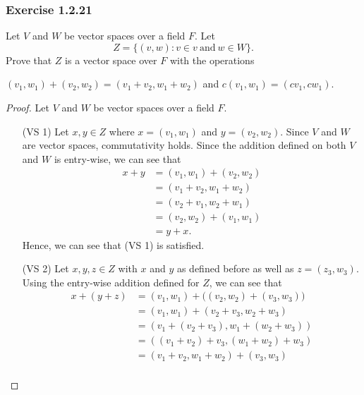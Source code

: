 \subsubsection{Exercise 1.2.21} 
Let \( V  \) and \( W  \) be vector spaces over a field \( F  \). Let 
\[  Z = \{ (v,w): v \in v \ \text{and} \  w \in W  \}. \]
Prove that \( Z  \) is a vector space over \( F  \) with the operations   
\begin{center}
   \( (v_{1}, w_{1}) + (v_{2}, w_{2}) = (v_{1} + v_{2} , w_{1} + w_{2} ) \) and \( c(v_{1}, w_{1} ) = (cv_{1}, cw_{1} ) \). 
\end{center}
\begin{proof}
    Let \( V  \) and \( W  \) be vector spaces over a field \( F  \).
\begin{enumerate}
    \item[(VS 1)] Let \( x,y \in Z  \) where \( x = (v_{1}, w_{1}) \) and \( y = (v_{2}, w_{2}) \). Since \( V  \) and \( W  \) are vector spaces, commutativity holds. Since the addition defined on both \( V  \) and \( W  \) is entry-wise, we can see that 
        \begin{align*}
            x + y &= (v_{1}, w_{1}) + (v_{2}, w_{2}) \\
                  &=  (v_{1} + v_{2}, w_{1} + w_{2} ) \\
                  &= (v_{2} + v_{1}, w_{2} +  w_{1}) \\
                  &=  (v_{2}, w_{2}) + (v_{1}, w_{1}) \\
                  &=  y + x.
        \end{align*}
        Hence, we can see that (VS 1) is satisfied.
    \item[(VS 2)] Let \( x, y, z \in Z  \) with \( x  \) and \( y  \) as defined before as well as \( z = (z_{3}, w_{3}) \). Using the entry-wise addition defined for \( Z  \), we can see that   
        \begin{align*}
            x + (y+z) &= (v_{1}, w_{1}) + \Big( (v_{2}, w_{2}) + (v_{3}, w_{3})  \Big)   \\
                      &= (v_{1}, w_{1}) +   (v_{2} + v_{3}, w_{2} + w_{3})   \\
                      &=  (v_{1} + (v_{2} + v_{3}), w_{1} + (w_{2} + w_{3})  ) \\
                      &= ( (v_{1} + v_{2}) + v_{3}, (w_{1} + w_{2})  + w_{3})  \\
                      &=  (v_{1} + v_{2} , w_{1} + w_{2}  ) + (v_{3} , w_{3}) \\

\end{align*}
\end{enumerate}
\end{proof}
